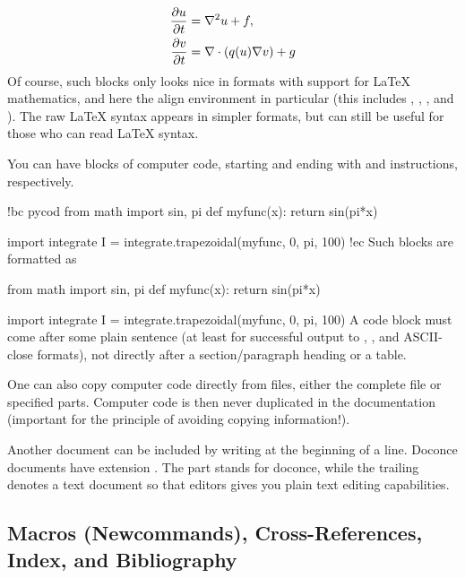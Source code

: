\documentclass[%
oneside,                 %
final,                   %
chapterprefix=true,      %
open=right               %
10pt]{book}
\begin{document}
\begin{align}
{\partial u\over\partial t} &= \nabla^2 u + f, \label{myeq1}\\
{\partial v\over\partial t} &= \nabla\cdot(q(u)\nabla v) + g
\end{align}
Of course, such blocks only looks nice in formats with support
for {\LaTeX} mathematics, and here the align environment in particular
(this includes , , , and ). The raw
{\LaTeX} syntax appears in simpler formats, but can still be useful
for those who can read {\LaTeX} syntax.

You can have blocks of computer code, starting and ending with
 and  instructions, respectively.

\bccq
!bc pycod
from math import sin, pi
def myfunc(x):
    return sin(pi*x)

import integrate
I = integrate.trapezoidal(myfunc, 0, pi, 100)
!ec
\eccq
Such blocks are formatted as

\bpycod
from math import sin, pi
def myfunc(x):
    return sin(pi*x)

import integrate
I = integrate.trapezoidal(myfunc, 0, pi, 100)
\epycod
A code block must come after some plain sentence (at least for successful
output to , , and ASCII-close formats),
not directly after a section/paragraph heading or a table.


One can also copy computer code directly from files, either the
complete file or specified parts.  Computer code is then never
duplicated in the documentation (important for the principle of
avoiding copying information!).

Another document can be included by writing 
at the beginning of a line.  Doconce documents have
extension . The  part stands for doconce, while the
trailing  denotes a text document so that editors gives you
plain text editing capabilities.

\subsection{Macros (Newcommands), Cross-References, Index, and Bibliography}

\label{newcommands}
\end{document}
